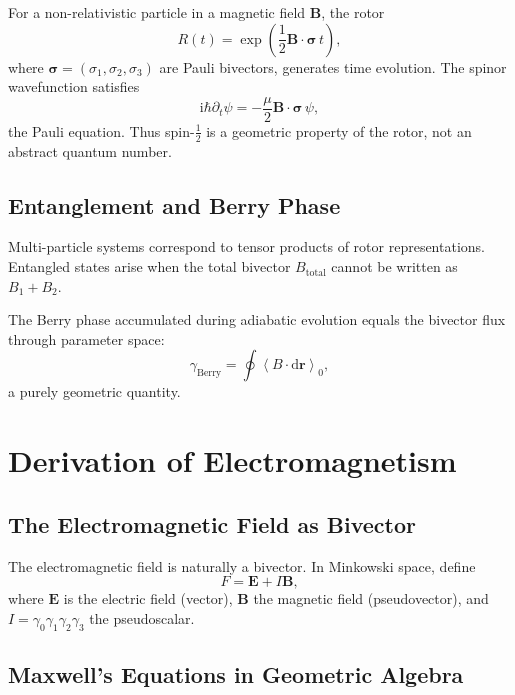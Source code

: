 \documentclass[11pt,a4paper]{article}
\numberwithin{equation}{section}
\theoremstyle{plain}
\theoremstyle{definition}
\theoremstyle{remark}
\newcommand{\grade}[2]{\left\langle #1 \right\rangle_{#2}}
\newcommand{\scal}[1]{\grade{#1}{0}}       %
\newcommand{\dd}{\mathrm{d}}
\newcommand{\ii}{\mathrm{i}}
\begin{document}
For a non-relativistic particle in a magnetic field $\mathbf{B}$, the rotor
\begin{equation}
R(t) = \exp\left(\frac{1}{2}\mathbf{B} \cdot \bm{\sigma}\, t\right),
\end{equation}
where $\bm{\sigma} = (\sigma_1,\sigma_2,\sigma_3)$ are Pauli bivectors, generates time evolution. The spinor wavefunction satisfies
\begin{equation}
\ii\hbar\partial_t\psi = -\frac{\mu}{2}\mathbf{B} \cdot \bm{\sigma}\,\psi,
\end{equation}
the Pauli equation. Thus spin-$\frac{1}{2}$ is a geometric property of the rotor, not an abstract quantum number.

\subsection{Entanglement and Berry Phase}

Multi-particle systems correspond to tensor products of rotor representations. Entangled states arise when the total bivector $B_{\mathrm{total}}$ cannot be written as $B_1 + B_2$.

The Berry phase accumulated during adiabatic evolution equals the bivector flux through parameter space:
\begin{equation}
\gamma_{\mathrm{Berry}} = \oint \scal{B \cdot \dd\mathbf{r}},
\end{equation}
a purely geometric quantity.

\section{Derivation of Electromagnetism}
\label{sec:em}

\subsection{The Electromagnetic Field as Bivector}

The electromagnetic field is naturally a bivector. In Minkowski space, define
\begin{equation}
F = \mathbf{E} + I\mathbf{B},
\label{eq:em-bivector}
\end{equation}
where $\mathbf{E}$ is the electric field (vector), $\mathbf{B}$ the magnetic field (pseudovector), and $I = \gamma_0\gamma_1\gamma_2\gamma_3$ the pseudoscalar.

\subsection{Maxwell's Equations in Geometric Algebra}
\end{document}
